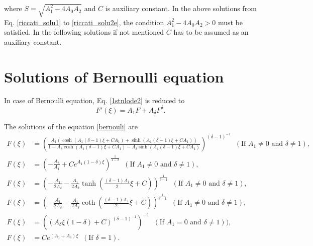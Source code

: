 \documentclass[prd,aps,floats,showkeys,nofootinbib,notitlepage]{revtex4}
\begin{document}
	where $S = \sqrt{A_1^2-4A_0A_2}$ and $C$ is auxiliary constant. In the above solutions from Eq. \eqref{riccati_solu1} to \eqref{riccati_solu2e}, the condition $A_1^2-4A_0A_2>0$ must be satisfied. In the following solutions if not mentioned $C$ has to be assumed as an auxiliary constant.
	
	\renewcommand{\theequation}{B-\arabic{equation}}
	\section{Solutions of Bernoulli equation}\label{sec:appenB}
	
	In case of Bernoulli equation, Eq. \eqref{1stnlode2} is reduced to
	\begin{equation}\label{bernouli}
		F'\left( \xi  \right) = {A_1}F + {A_\delta}F^{\delta}.
	\end{equation} 
	
	The solutions of the equation \eqref{bernouli} are \cite{yang}
	\begin{subequations}\label{bernouli_solu}
		\begin{align}
			F\left( \xi  \right) &= {\left( {\frac{{{A_1} \left( {\cosh \left( {{A_1}\left( {\delta - 1} \right) \xi + {C} {A_1}} \right) + \sinh \left( {{A_1} \left( {\delta - 1} \right)\xi + {C} {A_1}} \right)} \right)}}{{1 - {A_\delta} \cosh \left( {{A_1}\left( {\delta - 1} \right) \xi + {C} {A_1}} \right) - {A_\delta} \sinh \left( {{A_1}\left( {\delta - 1} \right) \xi + {C} {A_1}} \right)}}} \right)^{{{\left( {\delta - 1} \right)}^{ - 1}}}} \;\;(\text{If } A_1\neq 0\text{ and }\delta \neq 1),\\
			F\left( \xi  \right) &= {\left( { - \frac{{{A_\delta }}}{{{A_1}}} + C{e^{{A_1}(1 - \delta )\xi }}} \right)^{ \frac{1}{{1 - \delta }}}}\;\;(\text{If } A_1\neq 0\text{ and }\delta \neq 1), \\
			F\left( \xi  \right) &= {\left( { - \frac{{{A_1}}}{{2{A_\delta }}} - \frac{{{A_1}}}{{2{A_\delta }}}\tanh \left( {\frac{{(\delta  - 1){A_1}}}{2}\xi  + C} \right)} \right)^{\frac{1}{{\delta  - 1}}}}\;\;(\text{If } A_1\neq 0\text{ and }\delta \neq 1),\\
			F\left( \xi  \right) &= {\left( { - \frac{{{A_1}}}{{2{A_\delta }}} - \frac{{{A_1}}}{{2{A_\delta }}}\coth \left( {\frac{{(\delta  - 1){A_1}}}{2}\xi  + C} \right)} \right)^{\frac{1}{{\delta  - 1}}}}\;\;(\text{If } A_1\neq 0\text{ and }\delta \neq 1), \\ 
			F\left( \xi  \right) &= {\left( {{{\left( {{A_\delta} \xi(1 -  \delta) + {C}} \right)}^{{{\left( {\delta - 1} \right)}^{ - 1}}}}} \right)^{ - 1}} \;\;(\text{If } A_1=0 \text{ and } \delta \neq 1)),\\
			F\left( \xi  \right) &= C e^{({A_1} + {A_\delta })\xi }\;\; (\text{If }\delta = 1).
		\end{align}
	\end{subequations}
	
\end{document}
